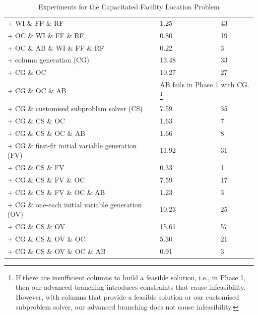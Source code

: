 \begin{table}[htp]
\begin{minipage}[l]{\textwidth}
\begin{small}
\begin{tabular}{|lll|}
+ WI \& FF \& RF                                   & 1.25 & 43 \\
+ OC \& WI \& FF \& RF                             & 0.80 & 19 \\
+ OC \& AB \& WI \& FF \& RF                       & 0.22 & 3 \\
+ column generation (CG)                           & 13.48 & 33 \\
+ CG \& OC                                         & 10.27 & 27 \\
+ CG \& OC \& AB                                   & \multicolumn{2}{l|}{AB fails in Phase 1 with CG. \footnote{If there are insufficient columns to build a feasible solution, i.e., in Phase 1, then our advanced branching introduces constraints that cause infeasibility. However, with columns that provide a feasible solution or our customised subproblem solver, our advanced branching does not cause infeasibility.}}\\
+ CG \& customised subproblem solver (CS)          & 7.59  & 35 \\
+ CG \& CS \& OC                                   & 1.63  & 7 \\
+ CG \& CS \& OC \& AB                             & 1.66  & 8 \\
+ CG \& first-fit initial variable generation (FV) & 11.92 & 31 \\
+ CG \& CS \& FV                                   & 0.33  & 1 \\
+ CG \& CS \& FV \& OC                             & 7.59  & 17 \\
+ CG \& CS \& FV \& OC \& AB                       & 1.23  & 3\\
+ CG \& one-each initial variable generation (OV)  & 10.23 & 25 \\
+ CG \& CS \& OV                                   & 15.61 & 57 \\
+ CG \& CS \& OV \& OC                             & 5.30  & 21 \\
+ CG \& CS \& OV \& OC \& AB                       & 0.91  & 3 \\
\hline
\end{tabular} 
\end{small}
\end{minipage}
\caption{Experiments for the Capacitated Facility Location Problem} \label{tab:fac_exp}
\end{table}

